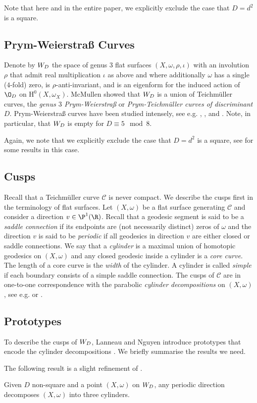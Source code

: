 \documentclass{amsart}
\makeatletter
\newcommand*{\@gobblenexttocentry}[9]{}
\newcommand*{\@gobblenexttocentry}[4]{}
\newcommand*{\addsubsection}{%
    \addtocontents{toc}{\protect\@gobblenexttocentry}%
    \subsection*}
\newcommand{\CC}{\mathcal{C}}
\renewcommand{\H}%
{\mathrm{H}}
\makeatother
\begin{document}
Note that here and in the entire paper, we explicitly exclude the case that $D=d^2$ is a square.


\addsubsection{Prym-Weierstraß Curves}
Denote by $\W$ the space of genus $3$ flat surfaces $(X,\omega,\rho,\iota)$ with an involution $\rho$ that admit real multiplication $\iota$ as above and where additionally $\omega$ has a single ($4$-fold) zero, is $\rho$-anti-invariant, and is an eigenform for the induced action of $\O_D$ on $\H^0(X,\omega_X)$. McMullen \cite{mcmullenprym} showed that $\W$ is a union of Teichmüller curves, the \emph{genus $3$ Prym-Weierstraß} or \emph{Prym-Teichmüller curves of discriminant $D$}. Prym-Weierstraß curves have been studied intensely, see e.g. \cite{mcmullenprym}, \cite{moellerprym}, \cite{lanneaunguyen} and \cite{TTZ}. Note, in particular, that $\W$ is empty for $D\equiv 5\mod 8$.

Again, we note that we explicitly exclude the case that $D=d^2$ is a square, see \cite[Appendix B]{lanneaunguyen} for some results in this case.


\addsubsection{Cusps} Recall that a Teichmüller curve $\CC$ is never compact. We describe the cusps first in the terminology of flat surfaces. Let $(X,\omega)$ be a flat surface generating $\CC$ and consider a direction $v\in\P^1(\R)$. Recall that  a geodesic segment is said to be a \emph{saddle connection} if its endpoints are (not necessarily distinct) zeros of $\omega$ and the direction $v$ is said to be \emph{periodic} if all geodesics in direction $v$ are either closed or saddle connections. We say that a \emph{cylinder} is a maximal union of homotopic geodesics on $(X,\omega)$ and any closed geodesic inside a cylinder is a \emph{core curve}. The length of a core curve is the \emph{width} of the cylinder. A cylinder is called \emph{simple} if each boundary consists of a simple saddle connection. The cusps of $\CC$ are in one-to-one correspondence with the parabolic \emph{cylinder decompositions} on $(X,\omega)$, see e.g. \cite[\S 4]{mcmullenspin} or \cite[\S 5.4]{parkcity}.


\addsubsection{Prototypes} To describe the cusps of $\W$, Lanneau and Nguyen introduce prototypes that encode the cylinder decompositions \cite[\S 3,4 and C]{lanneaunguyen}. We briefly summarise the results we need.

The following result is a slight refinement of \cite[Proposition 3.2]{lanneaunguyen}.
\begin{lemma}\label{3cylinders}
Given $D$ non-square and a point $(X,\omega)$ on $\W$, any periodic direction decomposes $(X,\omega)$ into three cylinders. 
\end{lemma}
\end{document}

